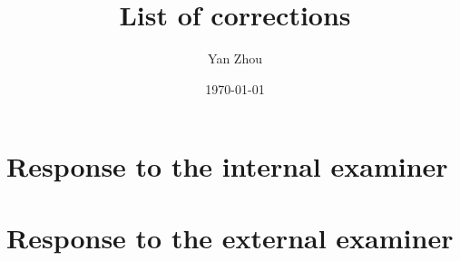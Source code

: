 \documentclass[11pt, fontset=Scala]{marticle}
\title{List of corrections}
\author{Yan Zhou}
\date{\today}
\begin{document}
\maketitle

\section{Response to the internal examiner} %
\label{sec:response_to_the_internal_examiner}


\section{Response to the external examiner} %
\label{sec:response_to_the_external_examiner}

\end{document}

